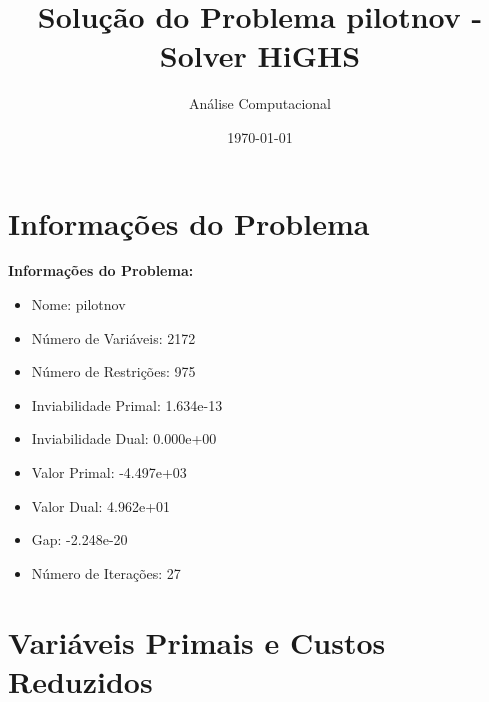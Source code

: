 \documentclass[12pt]{article}
\title{Solução do Problema pilotnov - Solver HiGHS}
\author{Análise Computacional}
\date{\today}
\begin{document}
\maketitle

\section{Informações do Problema}

\textbf{Informações do Problema:}
\begin{itemize}
\item Nome: pilotnov
\item Número de Variáveis: 2172
\item Número de Restrições: 975
\item Inviabilidade Primal: 1.634e-13
\item Inviabilidade Dual: 0.000e+00
\item Valor Primal: -4.497e+03
\item Valor Dual: 4.962e+01
\item Gap: -2.248e-20
\item Número de Iterações: 27
\end{itemize}


\section{Variáveis Primais e Custos Reduzidos}
\end{document}
